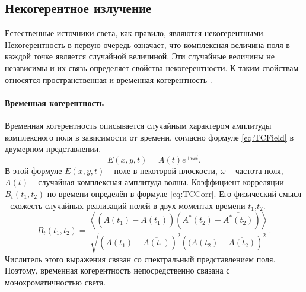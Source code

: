 \subsection{Некогерентное излучение}
Естественные источники света, как правило, являются некогерентными. Некогерентность в первую очередь означает, что комплексная величина поля в каждой точке является случайной величиной. Эти случайные величины не независимы и их связь определяет свойства некогерентности. К таким свойствам относятся пространственная и временная когерентность \cite{Ahmanov}.


\paragraph{Временная когерентность}
Временная когерентность описывается случайным характером амплитуды комплексного поля в зависимости от времени, согласно формуле \ref{eq:TCField} \cite{Ahmanov} в двумерном представлении.
\begin{equation}\label{eq:TCField}
	E(x,y,t) = A(t)e^{+i{\omega}t}.
\end{equation}
В этой формуле $E(x,y,t)$ -- поле в некоторой плоскости, $\omega$ -- частота поля, $A(t)$ -- случайная комплексная амплитуда волны. Коэффициент корреляции $B_t(t_1,t_2)$ по времени определён в формуле \ref{eq:TCCorr}. Его физический смысл - схожесть случайных реализаций полей в двух моментах времени $t_1$,$t_2$.
\begin{equation}\label{eq:TCCorr}
	B_t(t_1,t_2)=\frac
	{\left<\left(A(t_1) - \overline{A(t_1)}\right)\left(A^*(t_2) - \overline{A^*(t_2)}\right)\right>}
	{\sqrt{\left(A(t_1) - \overline{A(t_1)}\right)^2\left((A(t_2) - \overline{A(t_2)}\right)^2}}.
\end{equation}
Числитель этого выражения связан со спектральный представлением поля. Поэтому, временная когерентность непосредственно связана с монохроматичностью света.


